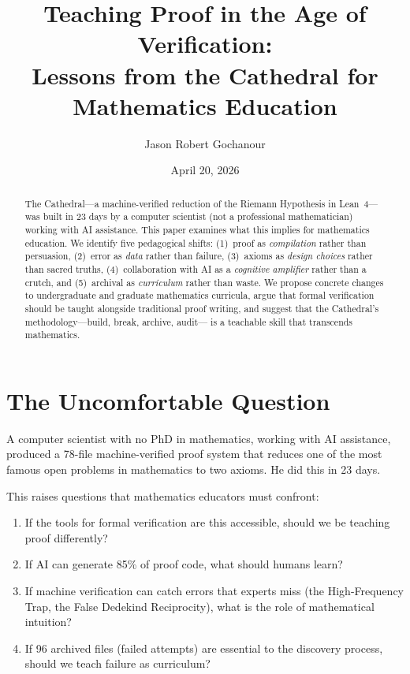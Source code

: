 \documentclass[11pt,a4paper]{article}
\title{%
  Teaching Proof in the Age of Verification:\\
  Lessons from the Cathedral for Mathematics Education%
}
\author{
  Jason Robert Gochanour
}
\date{April 20, 2026}
\begin{document}
\maketitle

\begin{abstract}
The Cathedral---a machine-verified reduction of the Riemann Hypothesis
in Lean~4---was built in 23 days by a computer scientist (not a
professional mathematician) working with AI assistance. This paper
examines what this implies for mathematics education. We identify
five pedagogical shifts: (1)~proof as \emph{compilation} rather than
persuasion, (2)~error as \emph{data} rather than failure,
(3)~axioms as \emph{design choices} rather than sacred truths,
(4)~collaboration with AI as a \emph{cognitive amplifier} rather
than a crutch, and (5)~archival as \emph{curriculum} rather
than waste. We propose concrete changes to undergraduate and
graduate mathematics curricula, argue that formal verification
should be taught alongside traditional proof writing, and suggest
that the Cathedral's methodology---build, break, archive, audit---
is a teachable skill that transcends mathematics.
\end{abstract}

\tableofcontents

\section{The Uncomfortable Question}

A computer scientist with no PhD in mathematics, working with AI
assistance, produced a 78-file machine-verified proof system that
reduces one of the most famous open problems in mathematics to two
axioms. He did this in 23 days.

This raises questions that mathematics educators must confront:

\begin{enumerate}
  \item If the tools for formal verification are this accessible,
    should we be teaching proof differently?
  \item If AI can generate 85\% of proof code, what should humans
    learn?
  \item If machine verification can catch errors that experts miss
    (the High-Frequency Trap, the False Dedekind Reciprocity), what
    is the role of mathematical intuition?
  \item If 96 archived files (failed attempts) are essential to the
    discovery process, should we teach failure as curriculum?
\end{enumerate}
\end{document}
